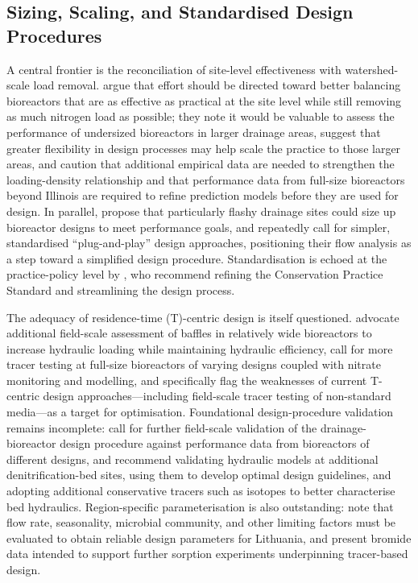 \documentclass[11pt]{article}
\begin{document}
\subsection{Sizing, Scaling, and Standardised Design Procedures}
A central frontier is the reconciliation of site-level effectiveness with watershed-scale load removal. \textcite{Christianson2026} argue that effort should be directed toward better balancing bioreactors that are as effective as practical at the site level while still removing as much nitrogen load as possible; they note it would be valuable to assess the performance of undersized bioreactors in larger drainage areas, suggest that greater flexibility in design processes may help scale the practice to those larger areas, and caution that additional empirical data are needed to strengthen the loading-density relationship and that performance data from full-size bioreactors beyond Illinois are required to refine prediction models before they are used for design. In parallel, \textcite{Dougherty2020b} propose that particularly flashy drainage sites could size up bioreactor designs to meet performance goals, and repeatedly call for simpler, standardised ``plug-and-play'' design approaches, positioning their flow analysis as a step toward a simplified design procedure. Standardisation is echoed at the practice-policy level by \textcite{Christianson2021}, who recommend refining the Conservation Practice Standard and streamlining the design process.

The adequacy of residence-time (T)-centric design is itself questioned. \textcite{deOliveira2023} advocate additional field-scale assessment of baffles in relatively wide bioreactors to increase hydraulic loading while maintaining hydraulic efficiency, call for more tracer testing at full-size bioreactors of varying designs coupled with nitrate monitoring and modelling, and specifically flag the weaknesses of current T-centric design approaches---including field-scale tracer testing of non-standard media---as a target for optimisation. Foundational design-procedure validation remains incomplete: \textcite{Christianson2013} call for further field-scale validation of the drainage-bioreactor design procedure against performance data from bioreactors of different designs, and \textcite{Ghane2015} recommend validating hydraulic models at additional denitrification-bed sites, using them to develop optimal design guidelines, and adopting additional conservative tracers such as isotopes to better characterise bed hydraulics. Region-specific parameterisation is also outstanding: \textcite{Povilaitis2020} note that flow rate, seasonality, microbial community, and other limiting factors must be evaluated to obtain reliable design parameters for Lithuania, and \textcite{Ghane2019} present bromide data intended to support further sorption experiments underpinning tracer-based design.
\end{document}
